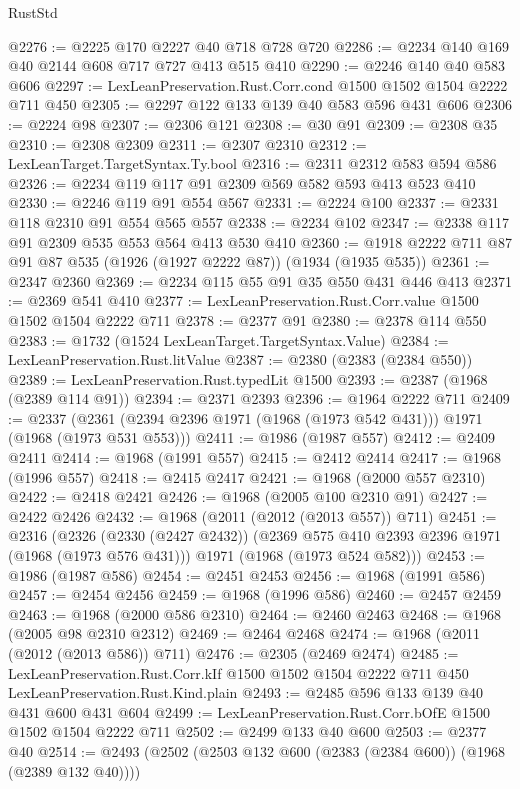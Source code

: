 \begin{lexlean}{RustStd}
\begin{coremodule}
@2276 := @2225 @170 @2227 @40 @718 @728 @720
@2286 := @2234 @140 @169 @40 @2144 @608 @717 @727 @413 @515 @410
@2290 := @2246 @140 @40 @583 @606
@2297 := LexLeanPreservation.Rust.Corr.cond @1500 @1502 @1504 @2222 @711 @450
@2305 := @2297 @122 @133 @139 @40 @583 @596 @431 @606
@2306 := @2224 @98
@2307 := @2306 @121
@2308 := @30 @91
@2309 := @2308 @35
@2310 := @2308 @2309
@2311 := @2307 @2310
@2312 := LexLeanTarget.TargetSyntax.Ty.bool
@2316 := @2311 @2312 @583 @594 @586
@2326 := @2234 @119 @117 @91 @2309 @569 @582 @593 @413 @523 @410
@2330 := @2246 @119 @91 @554 @567
@2331 := @2224 @100
@2337 := @2331 @118 @2310 @91 @554 @565 @557
@2338 := @2234 @102
@2347 := @2338 @117 @91 @2309 @535 @553 @564 @413 @530 @410
@2360 := @1918 @2222 @711 @87 @91 @87 @535 (@1926 (@1927 @2222 @87)) (@1934 (@1935 @535))
@2361 := @2347 @2360
@2369 := @2234 @115 @55 @91 @35 @550 @431 @446 @413
@2371 := @2369 @541 @410
@2377 := LexLeanPreservation.Rust.Corr.value @1500 @1502 @1504 @2222 @711
@2378 := @2377 @91
@2380 := @2378 @114 @550
@2383 := @1732 (@1524 LexLeanTarget.TargetSyntax.Value)
@2384 := LexLeanPreservation.Rust.litValue
@2387 := @2380 (@2383 (@2384 @550))
@2389 := LexLeanPreservation.Rust.typedLit @1500
@2393 := @2387 (@1968 (@2389 @114 @91))
@2394 := @2371 @2393
@2396 := @1964 @2222 @711
@2409 := @2337 (@2361 (@2394 @2396 @1971 (@1968 (@1973 @542 @431))) @1971 (@1968 (@1973 @531 @553)))
@2411 := @1986 (@1987 @557)
@2412 := @2409 @2411
@2414 := @1968 (@1991 @557)
@2415 := @2412 @2414
@2417 := @1968 (@1996 @557)
@2418 := @2415 @2417
@2421 := @1968 (@2000 @557 @2310)
@2422 := @2418 @2421
@2426 := @1968 (@2005 @100 @2310 @91)
@2427 := @2422 @2426
@2432 := @1968 (@2011 (@2012 (@2013 @557)) @711)
@2451 := @2316
    (@2326
      (@2330 (@2427 @2432))
      (@2369 @575 @410 @2393 @2396 @1971 (@1968 (@1973 @576 @431)))
      @1971
      (@1968 (@1973 @524 @582)))
@2453 := @1986 (@1987 @586)
@2454 := @2451 @2453
@2456 := @1968 (@1991 @586)
@2457 := @2454 @2456
@2459 := @1968 (@1996 @586)
@2460 := @2457 @2459
@2463 := @1968 (@2000 @586 @2310)
@2464 := @2460 @2463
@2468 := @1968 (@2005 @98 @2310 @2312)
@2469 := @2464 @2468
@2474 := @1968 (@2011 (@2012 (@2013 @586)) @711)
@2476 := @2305 (@2469 @2474)
@2485 := LexLeanPreservation.Rust.Corr.kIf
    @1500
    @1502
    @1504
    @2222
    @711
    @450
    LexLeanPreservation.Rust.Kind.plain
@2493 := @2485 @596 @133 @139 @40 @431 @600 @431 @604
@2499 := LexLeanPreservation.Rust.Corr.bOfE @1500 @1502 @1504 @2222 @711
@2502 := @2499 @133 @40 @600
@2503 := @2377 @40
@2514 := @2493 (@2502 (@2503 @132 @600 (@2383 (@2384 @600)) (@1968 (@2389 @132 @40))))

\end{coremodule}
\end{lexlean}
